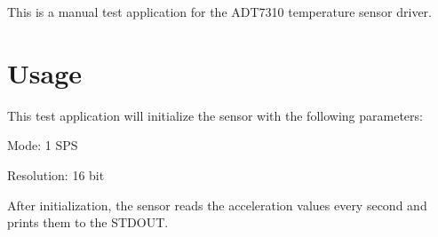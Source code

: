 This is a manual test application for the A\+D\+T7310 temperature sensor driver.

\section*{Usage}

This test application will initialize the sensor with the following parameters\+:
\begin{DoxyItemize}
\item Mode\+: 1 S\+PS
\item Resolution\+: 16 bit
\end{DoxyItemize}

After initialization, the sensor reads the acceleration values every second and prints them to the S\+T\+D\+O\+UT. 